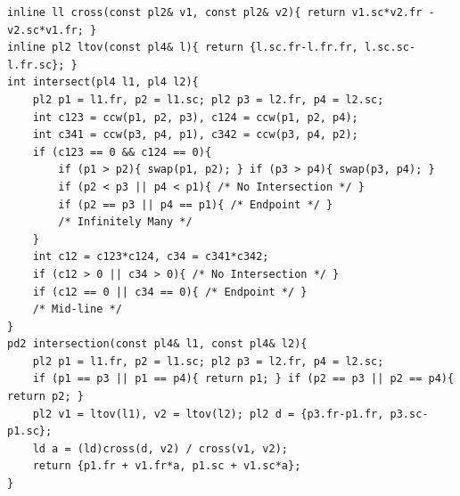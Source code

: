 \begin{verbatim}
inline ll cross(const pl2& v1, const pl2& v2){ return v1.sc*v2.fr - v2.sc*v1.fr; }
inline pl2 ltov(const pl4& l){ return {l.sc.fr-l.fr.fr, l.sc.sc-l.fr.sc}; }
int intersect(pl4 l1, pl4 l2){
	pl2 p1 = l1.fr, p2 = l1.sc; pl2 p3 = l2.fr, p4 = l2.sc;
	int c123 = ccw(p1, p2, p3), c124 = ccw(p1, p2, p4);
	int c341 = ccw(p3, p4, p1), c342 = ccw(p3, p4, p2);
	if (c123 == 0 && c124 == 0){
		if (p1 > p2){ swap(p1, p2); } if (p3 > p4){ swap(p3, p4); }
		if (p2 < p3 || p4 < p1){ /* No Intersection */ }
		if (p2 == p3 || p4 == p1){ /* Endpoint */ }
		/* Infinitely Many */
	}
	int c12 = c123*c124, c34 = c341*c342;
	if (c12 > 0 || c34 > 0){ /* No Intersection */ }
	if (c12 == 0 || c34 == 0){ /* Endpoint */ }
	/* Mid-line */
}
pd2 intersection(const pl4& l1, const pl4& l2){
	pl2 p1 = l1.fr, p2 = l1.sc; pl2 p3 = l2.fr, p4 = l2.sc;
	if (p1 == p3 || p1 == p4){ return p1; } if (p2 == p3 || p2 == p4){ return p2; }
	pl2 v1 = ltov(l1), v2 = ltov(l2); pl2 d = {p3.fr-p1.fr, p3.sc-p1.sc};
	ld a = (ld)cross(d, v2) / cross(v1, v2);
	return {p1.fr + v1.fr*a, p1.sc + v1.sc*a};
}
\end{verbatim}